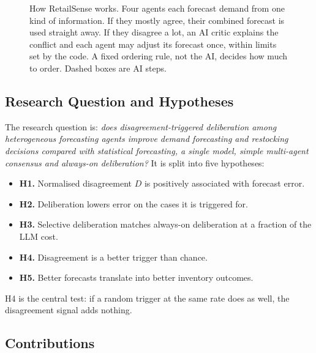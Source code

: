 \documentclass[conference]{IEEEtran}
\begin{document}
\begin{figure}[t]
\caption{How RetailSense works. Four agents each forecast demand from one kind of information. If
they mostly agree, their combined forecast is used straight away. If they disagree a lot, an AI
critic explains the conflict and each agent may adjust its forecast once, within limits set by the
code. A fixed ordering rule, not the AI, decides how much to order. Dashed boxes are AI steps.}
\label{fig:system}
\end{figure}

\subsection{Research Question and Hypotheses}

The research question is: \emph{does disagreement-triggered deliberation among heterogeneous
forecasting agents improve demand forecasting and restocking decisions compared with statistical
forecasting, a single model, simple multi-agent consensus and always-on deliberation?} It is split
into five hypotheses:
\begin{itemize}
\item \textbf{H1.} Normalised disagreement $D$ is positively associated with forecast error.
\item \textbf{H2.} Deliberation lowers error on the cases it is triggered for.
\item \textbf{H3.} Selective deliberation matches always-on deliberation at a fraction of the LLM
cost.
\item \textbf{H4.} Disagreement is a better trigger than chance.
\item \textbf{H5.} Better forecasts translate into better inventory outcomes.
\end{itemize}
H4 is the central test: if a random trigger at the same rate does as well, the disagreement signal
adds nothing.

\subsection{Contributions}
\end{document}
